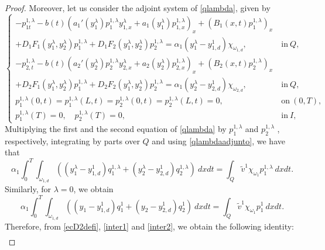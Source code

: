 \documentclass[11pt,a4paper]{amsart}
\numberwithin{equation}{section}
\begin{document}
\begin{proof}
    Moreover, let us consider the adjoint system of \eqref{qlambda}, given by 
    \begin{equation}\label{qlambdaadjunto}
    	\begin{cases}
    		-p^{1,\lambda}_{1t}-b(t)\left(a_1'(y^\lambda_{1}) p^{1,\lambda}_{1} y^\lambda_{1,x} + a_1(y^\lambda_{1})p^{1,\lambda}_{1,x}\right)_x+\left(B_1(x,t)p^{1,\lambda}_1\right)_x \\
            + D_1 F_1(y_1^\lambda,y_2^\lambda)p^{1,\lambda}_1 + D_1 F_2(y_1^\lambda,y_2^\lambda)p^{1,\lambda}_2 =\alpha_1\left( y^\lambda_1-y_{1,d}^1  \right) \chi_{\omega_{1,d}}, &\ \text{in} \ {Q}, \\
    		-p^{1,\lambda}_{2,t}-b(t)\left(a_2'(y^\lambda_{2})p^{1,\lambda}_{2}y^\lambda_{2,x} + a_2(y^\lambda_{2})p^{1,\lambda}_{2,x}\right)_x+\left(B_2(x,t)p^{1,\lambda}_2\right)_x \\
            + D_2 F_1(y_1^\lambda,y_2^\lambda)p^{1,\lambda}_1 + D_2 F_2(y_1^\lambda,y_2^\lambda)p^{1,\lambda}_2 =\alpha_1\left( y^\lambda_2-y_{2,d}^1  \right)\chi_{\omega_{2,d}}, &\ \text{in} \ {Q},\\
    		p^{1,\lambda}_1(0,t)=p^{1,\lambda}_1(L,t)=p^{1,\lambda}_2(0,t)=p^{1,\lambda}_2(L,t)=0, & \ \text{on} \  {(0,T)},\\
    		p^{1,\lambda}_1(T)=0, \quad p^{1,\lambda}_2(T)=0, & \ \text{in} \ I,
    	\end{cases}
    \end{equation}Multiplying the first and the second equation of \eqref{qlambda} by $p^{1,\lambda}_{1}$ and $p^{1,\lambda}_{2}$ , respectively, integrating by parts over $Q$ and using \eqref{qlambdaadjunto}, we have that
\begin{equation}\label{inter1}
		\alpha_1\int_{0}^{T}\int_{\omega_{1,d}}\left( (y_1^\lambda-y^1_{1,d})q^{1,\lambda}_1+(y_2^\lambda-y^1_{2,d})q^{1,\lambda}_2 \right)\ dx dt=\int_{Q} \widetilde{v}^1\chi_{\omega_1}p^{1,\lambda}_{1} \ dxdt.
	\end{equation}Similarly, for $\lambda=0$, we obtain
	\begin{equation}\label{inter2}
		\alpha_1\int_{0}^{T}\int_{\omega_{1,d}}\left( (y_1-y^1_{1,d})q^{1}_1+(y_2-y^1_{2,d})q^{1}_2 \right)\ dx dt=\int_{Q} \widetilde{v}^1\chi_{\omega_1}p^{1}_{1} \ dxdt.	\end{equation}Therefore, from \eqref{ecD2defi}, \eqref{inter1} and \eqref{inter2}, we obtain the following identity:
        \begin{equation}\label{ecD2defisimpli}
        \begin{split}

\end{split}
\end{equation}
\end{proof}
\end{document}
